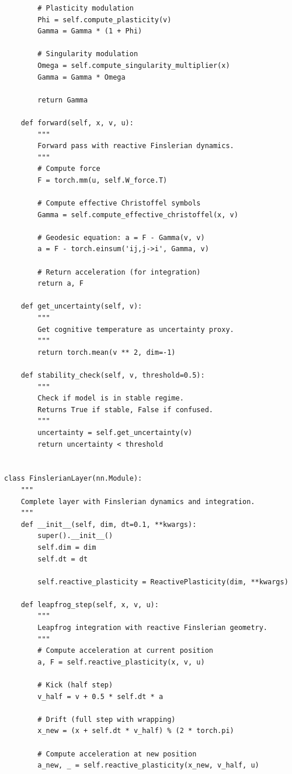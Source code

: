 \documentclass[12pt,letterpaper,twoside]{article}
\begin{document}
\begin{verbatim}
        # Plasticity modulation
        Phi = self.compute_plasticity(v)
        Gamma = Gamma * (1 + Phi)
        
        # Singularity modulation
        Omega = self.compute_singularity_multiplier(x)
        Gamma = Gamma * Omega
        
        return Gamma
    
    def forward(self, x, v, u):
        """
        Forward pass with reactive Finslerian dynamics.
        """
        # Compute force
        F = torch.mm(u, self.W_force.T)
        
        # Compute effective Christoffel symbols
        Gamma = self.compute_effective_christoffel(x, v)
        
        # Geodesic equation: a = F - Gamma(v, v)
        a = F - torch.einsum('ij,j->i', Gamma, v)
        
        # Return acceleration (for integration)
        return a, F
    
    def get_uncertainty(self, v):
        """
        Get cognitive temperature as uncertainty proxy.
        """
        return torch.mean(v ** 2, dim=-1)
    
    def stability_check(self, v, threshold=0.5):
        """
        Check if model is in stable regime.
        Returns True if stable, False if confused.
        """
        uncertainty = self.get_uncertainty(v)
        return uncertainty < threshold


class FinslerianLayer(nn.Module):
    """
    Complete layer with Finslerian dynamics and integration.
    """
    def __init__(self, dim, dt=0.1, **kwargs):
        super().__init__()
        self.dim = dim
        self.dt = dt
        
        self.reactive_plasticity = ReactivePlasticity(dim, **kwargs)
        
    def leapfrog_step(self, x, v, u):
        """
        Leapfrog integration with reactive Finslerian geometry.
        """
        # Compute acceleration at current position
        a, F = self.reactive_plasticity(x, v, u)
        
        # Kick (half step)
        v_half = v + 0.5 * self.dt * a
        
        # Drift (full step with wrapping)
        x_new = (x + self.dt * v_half) % (2 * torch.pi)
        
        # Compute acceleration at new position
        a_new, _ = self.reactive_plasticity(x_new, v_half, u)
        

\end{verbatim}
\end{document}
